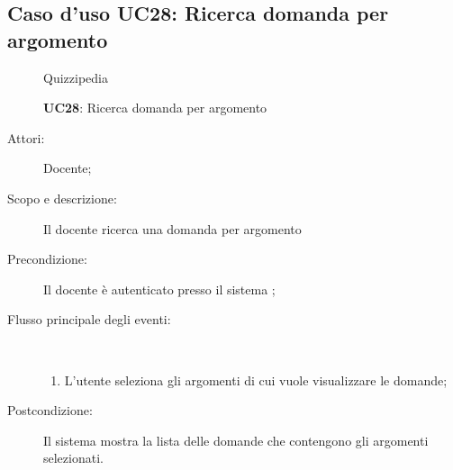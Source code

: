 \subsection{Caso d'uso UC28: Ricerca domanda per argomento}
	\begin{figure}[H]
		\centering
		\begin{resizedtikzpicture}{\textwidth}
		\begin{umlsystem}[x=0, fill=lightgray!20]{Quizzipedia}
		\end{umlsystem}
		\end{resizedtikzpicture}
		\caption{\textbf{UC28}: Ricerca domanda per argomento}
		\label{UC28}
	\end{figure}
\begin{description}
\item[Attori:] Docente;
\item[Scopo e descrizione:] Il docente ricerca una domanda per argomento
      \item[Precondizione:] Il docente è autenticato presso il sistema
;

        \item[Flusso principale degli eventi:] \ 
 \begin{enumerate}
          \item L'utente seleziona gli argomenti di cui vuole visualizzare le domande;

      \end{enumerate}
    \item[Postcondizione:] Il sistema mostra la lista delle domande che contengono gli argomenti selezionati.
  \end{description}
\hypertarget{UC29}{}
